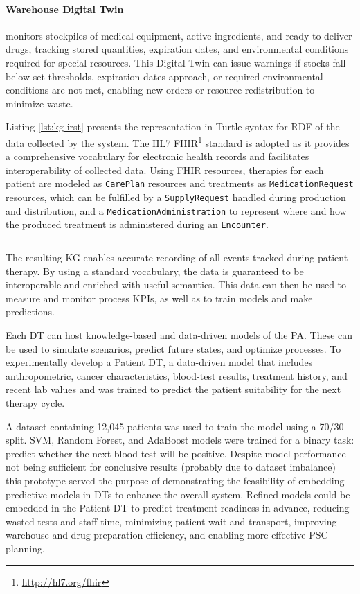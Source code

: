 \paragraph{Warehouse Digital Twin} monitors stockpiles of medical equipment, active ingredients, and ready-to-deliver drugs, tracking stored quantities, expiration dates, and environmental conditions required for special resources.  
%
This Digital Twin can issue warnings if stocks fall below set thresholds, expiration dates approach, or required environmental conditions are not met, enabling new orders or resource redistribution to minimize waste. 

\medskip

Listing \ref{lst:kg-irst} presents the representation in Turtle syntax for RDF of the data collected by the system. 
%
The HL7 FHIR\footnote{\url{http://hl7.org/fhir}} standard is adopted as it provides a comprehensive vocabulary for electronic health records and facilitates interoperability of collected data.
%
Using FHIR resources, therapies for each patient are modeled as \texttt{CarePlan} resources and treatments as \texttt{MedicationRequest} resources, which can be fulfilled by a \texttt{SupplyRequest} handled during production and distribution, and a \texttt{MedicationAdministration} to represent where and how the produced treatment is administered during an \texttt{Encounter}.

\begin{code}
\label{lst:kg-irst}
\inputminted{turtle}{listings/applications/KG_Partial.ttl}
\end{code}

The resulting \ac{KG} enables accurate recording of all events tracked during patient therapy. By using a standard vocabulary, the data is guaranteed to be interoperable and enriched with useful semantics.
%
This data can then be used to measure and monitor process KPIs, as well as to train models and make predictions.


Each \ac{DT} can host knowledge-based and data-driven models of the \ac{PA}.
These can be used to simulate scenarios, predict future states, and optimize processes.
%
To experimentally develop a Patient \ac{DT}, a data-driven model that includes anthropometric, cancer characteristics, blood-test results, treatment history, and recent lab values and was trained to predict the patient suitability for the next therapy cycle.

A dataset containing 12,045 patients was used to train the model using a 70/30 split. SVM, Random Forest, and AdaBoost models were trained for a binary task: predict whether the next blood test will be positive.
%
Despite model performance not being sufficient for conclusive results (probably due to dataset imbalance)
this prototype served the purpose of demonstrating the feasibility of embedding predictive models in \acp{DT} to enhance the overall system.
%
Refined models could be embedded in the Patient \ac{DT} to predict treatment readiness in advance, reducing wasted tests and staff time, minimizing patient wait and transport, improving warehouse and drug-preparation efficiency, and enabling more effective PSC planning.
